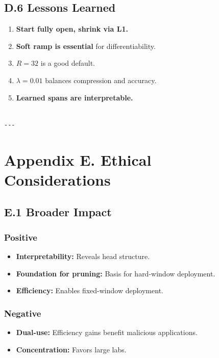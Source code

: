 \subsection{D.6 Lessons Learned}

\begin{enumerate}
\item \textbf{Start fully open, shrink via L1.}
\item \textbf{Soft ramp is essential} for differentiability.
\item \textbf{$R = 32$} is a good default.
\item \textbf{$\lambda = 0.01$} balances compression and accuracy.
\item \textbf{Learned spans are interpretable.}
\end{enumerate}
\begin{lstlisting}

---
\end{lstlisting}


\section{Appendix E. Ethical Considerations}

\subsection{E.1 Broader Impact}

\subsubsection{Positive}
\begin{itemize}
\item \textbf{Interpretability:} Reveals head structure.
\item \textbf{Foundation for pruning:} Basis for hard-window deployment.
\item \textbf{Efficiency:} Enables fixed-window deployment.

\end{itemize}
\subsubsection{Negative}
\begin{itemize}
\item \textbf{Dual-use:} Efficiency gains benefit malicious applications.
\item \textbf{Concentration:} Favors large labs.

\end{itemize}
